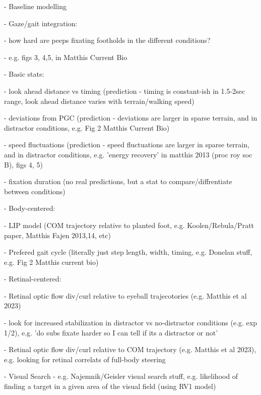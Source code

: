 - Baseline modelling

  - Gaze/gait integration:
  
    - how hard are peeps fixating footholds in the different conditions?
    
        - e.g. figs 3, 4,5, in Matthis Current Bio

  - Basic stats:
  
    - look ahead distance vs timing (prediction - timing is constant-ish in 1.5-2sec range, look ahead distance varies with terrain/walking speed)
    
    - deviations from PGC (prediction - deviations are larger in sparse terrain, and in distractor conditions, e.g. Fig 2 Matthis Current Bio)
    
    - speed fluctuations (prediction - speed fluctuations are larger in sparse terrain, and in distractor conditions, e.g. 'energy recovery' in matthis 2013 (proc roy soc B), figs 4, 5)
    
    - fixation duration (no real predictions, but a stat to compare/diffrentiate between conditions)
  
  - Body-centered:
  
      - LIP model (COM trajectory relative to planted foot, e.g. Koolen/Rebula/Pratt paper, Matthis Fajen 2013,14, etc)
      
      - Prefered gait cycle (literally just step length, width, timing, e.g. Donelan stuff, e.g. Fig 2 Matthis current bio)

  
  - Retinal-centered:
  
      - Retinal optic flow div/curl relative to eyeball trajecotories (e.g. Matthis et al 2023)
      
        - look for increased stabilization in distractor vs no-distractor conditions (e.g. exp 1/2), e.g. 'do subs fixate harder so I can tell if its a distractor or not'
        
        - Retinal optic flow div/curl relative to COM trajectory (e.g. Matthis et al 2023), e.g. looking for retinal correlats of full-body steering
      
      - Visual Search - e.g. Najemnik/Geisler visual search stuff, e.g. likelihood of finding a target in a given area of the visual field (using RV1 model)



% 
